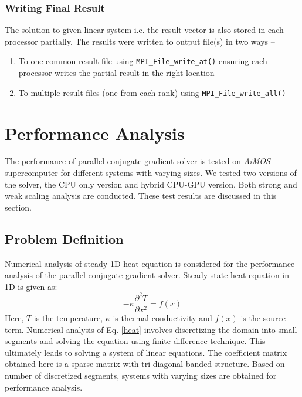 \documentclass[sigplan,screen]{acmart}
\begin{document}
\subsubsection{Writing Final Result}
The solution to given linear system i.e. the result vector is also stored in each processor partially. The results were written to output file(s) in two ways -- 
\begin{enumerate}
	\item To one common result file using \texttt{MPI\_File\_write\_at()} ensuring each processor writes the partial result in the right location
	\item To multiple result files (one from each rank) using \texttt{MPI\_File\_write\_all()}
\end{enumerate}


\section{Performance Analysis}
The performance of parallel conjugate gradient solver is tested on \emph{AiMOS} supercomputer for different systems with varying sizes. We tested two versions of the solver, the CPU only version and hybrid CPU-GPU version. Both strong and weak scaling analysis are conducted. These test results are discussed in this section. 
\subsection{Problem Definition}
Numerical analysis of steady 1D heat equation is considered for the performance analysis of the parallel conjugate gradient solver. Steady state heat equation in 1D is given as:
\begin{equation}\label{heat}
-\kappa\frac{\partial^2 T}{\partial x^2}= f(x)
\end{equation}
Here, $T$ is the temperature, $\kappa$ is thermal conductivity and $f(x)$ is the source term. Numerical analysis of Eq. \eqref{heat} involves discretizing the domain into small segments and solving the equation using finite difference technique. This ultimately leads to solving a system of linear equations. The coefficient matrix obtained here is a sparse matrix with tri-diagonal banded structure. Based on number of discretized segments, systems with varying sizes are obtained for performance analysis. 
\end{document}
